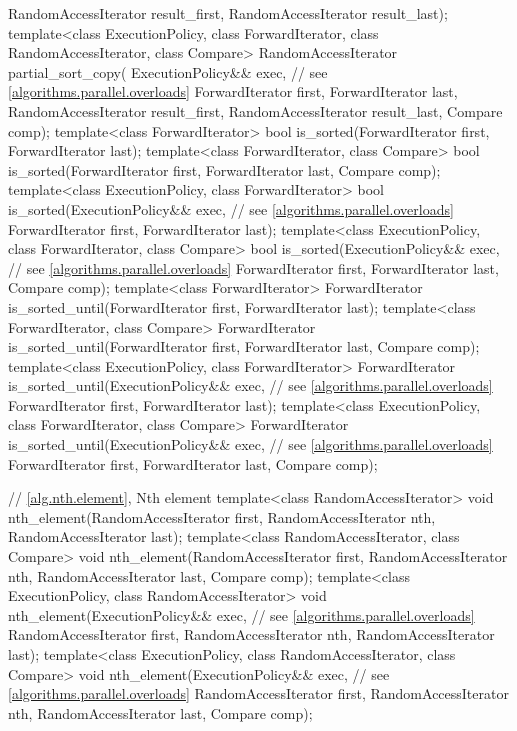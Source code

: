 \begin{codeblock}
{      RandomAccessIterator result_first,
      RandomAccessIterator result_last);
  template<class ExecutionPolicy, class ForwardIterator, class RandomAccessIterator,
           class Compare>
    RandomAccessIterator partial_sort_copy(
      ExecutionPolicy&& exec,  // see \ref{algorithms.parallel.overloads}
      ForwardIterator first, ForwardIterator last,
      RandomAccessIterator result_first,
      RandomAccessIterator result_last,
      Compare comp);
  template<class ForwardIterator>
    bool is_sorted(ForwardIterator first, ForwardIterator last);
  template<class ForwardIterator, class Compare>
    bool is_sorted(ForwardIterator first, ForwardIterator last,
                   Compare comp);
  template<class ExecutionPolicy, class ForwardIterator>
    bool is_sorted(ExecutionPolicy&& exec, // see \ref{algorithms.parallel.overloads}
                   ForwardIterator first, ForwardIterator last);
  template<class ExecutionPolicy, class ForwardIterator, class Compare>
    bool is_sorted(ExecutionPolicy&& exec, // see \ref{algorithms.parallel.overloads}
                   ForwardIterator first, ForwardIterator last,
                   Compare comp);
  template<class ForwardIterator>
    ForwardIterator is_sorted_until(ForwardIterator first, ForwardIterator last);
  template<class ForwardIterator, class Compare>
    ForwardIterator is_sorted_until(ForwardIterator first, ForwardIterator last,
                                    Compare comp);
  template<class ExecutionPolicy, class ForwardIterator>
    ForwardIterator is_sorted_until(ExecutionPolicy&& exec, // see \ref{algorithms.parallel.overloads}
                                    ForwardIterator first, ForwardIterator last);
  template<class ExecutionPolicy, class ForwardIterator, class Compare>
    ForwardIterator is_sorted_until(ExecutionPolicy&& exec, // see \ref{algorithms.parallel.overloads}
                                    ForwardIterator first, ForwardIterator last,
                                    Compare comp);

  // \ref{alg.nth.element}, Nth element
  template<class RandomAccessIterator>
    void nth_element(RandomAccessIterator first, RandomAccessIterator nth,
                     RandomAccessIterator last);
  template<class RandomAccessIterator, class Compare>
    void nth_element(RandomAccessIterator first, RandomAccessIterator nth,
                     RandomAccessIterator last, Compare comp);
  template<class ExecutionPolicy, class RandomAccessIterator>
    void nth_element(ExecutionPolicy&& exec, // see \ref{algorithms.parallel.overloads}
                     RandomAccessIterator first, RandomAccessIterator nth,
                     RandomAccessIterator last);
  template<class ExecutionPolicy, class RandomAccessIterator, class Compare>
    void nth_element(ExecutionPolicy&& exec, // see \ref{algorithms.parallel.overloads}
                     RandomAccessIterator first, RandomAccessIterator nth,
                     RandomAccessIterator last, Compare comp);

}
\end{codeblock}
